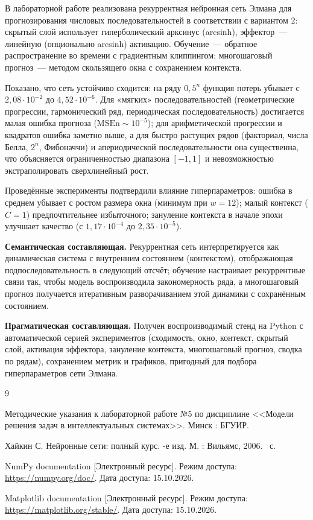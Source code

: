 
В лабораторной работе реализована рекуррентная нейронная сеть Элмана для прогнозирования числовых последовательностей в соответствии с вариантом 2: скрытый слой использует гиперболический арксинус (arcsinh), эффектор~--- линейную (опционально arcsinh) активацию. Обучение~--- обратное распространение во времени с градиентным клиппингом; многошаговый прогноз~--- методом скользящего окна с сохранением контекста.

Показано, что сеть устойчиво сходится: на ряду $0{,}5^n$ функция потерь убывает с $2{,}08 \cdot 10^{-2}$ до $4{,}52 \cdot 10^{-6}$. Для «мягких» последовательностей (геометрические прогрессии, гармонический ряд, периодическая последовательность) достигается малая ошибка прогноза ($\mathrm{MSEn} \sim 10^{-5}$); для арифметической прогрессии и квадратов ошибка заметно выше, а для быстро растущих рядов (факториал, числа Белла, $2^n$, Фибоначчи) и апериодической последовательности она существенна, что объясняется ограниченностью диапазона $[-1, 1]$ и невозможностью экстраполировать сверхлинейный рост.

Проведённые эксперименты подтвердили влияние гиперпараметров: ошибка в среднем убывает с ростом размера окна (минимум при $w = 12$); малый контекст ($C = 1$) предпочтительнее избыточного; зануление контекста в начале эпохи улучшает качество (с $1{,}17 \cdot 10^{-4}$ до $2{,}35 \cdot 10^{-5}$).

\textbf{Семантическая составляющая.} Рекуррентная сеть интерпретируется как динамическая система с внутренним состоянием (контекстом), отображающая подпоследовательность в следующий отсчёт; обучение настраивает рекуррентные связи так, чтобы модель воспроизводила закономерность ряда, а многошаговый прогноз получается итеративным разворачиванием этой динамики с сохранённым состоянием.

\textbf{Прагматическая составляющая.} Получен воспроизводимый стенд на Python с автоматической серией экспериментов (сходимость, окно, контекст, скрытый слой, активация эффектора, зануление контекста, многошаговый прогноз, сводка по рядам), сохранением метрик и графиков, пригодный для подбора гиперпараметров сети Элмана.

\begin{thebibliography}{9}

	Методические указания к лабораторной работе №5 по дисциплине <<Модели решения задач в интеллектуальных системах>>. \mdash  Минск : БГУИР.

	Хайкин С. Нейронные сети: полный курс. -е изд. \mdash  М. : Вильямс, 2006. ~с.

	NumPy documentation [Электронный ресурс]. \mdash  Режим доступа: \url{https://numpy.org/doc/}. \mdash  Дата доступа: 15.10.2026.

	Matplotlib documentation [Электронный ресурс]. \mdash  Режим доступа: \url{https://matplotlib.org/stable/}. \mdash  Дата доступа: 15.10.2026.
\end{thebibliography}
